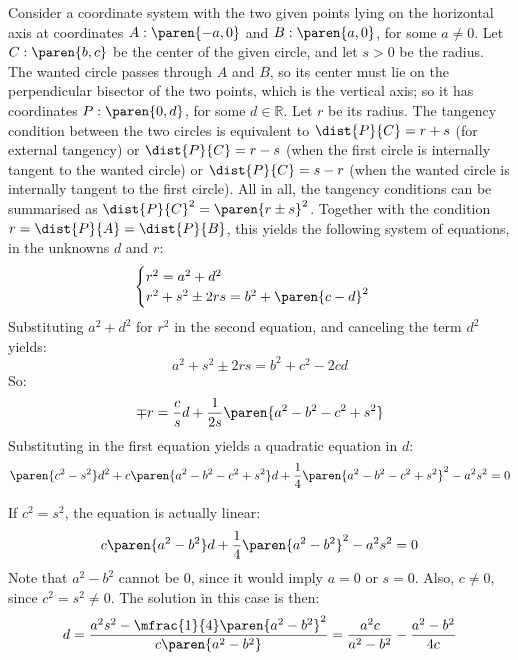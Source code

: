 Consider a coordinate system with the two given points lying on the horizontal axis
at coordinates $A: \paren{-a, 0}$ and $B: \paren{a, 0}$, for some $a \neq 0$.
Let $C: \paren{b, c}$ be the center of the given circle,
and let $s > 0$ be the radius. \newline
The wanted circle passes through $A$ and $B$,
so its center must lie on the perpendicular bisector of the two points,
which is the vertical axis;
so it has coordinates $P: \paren{0, d}$,
for some $d \in \mathbb{R}$.
Let $r$ be its radius.
The tangency condition between the two circles is equivalent to
$\dist{P}{C} = r + s$ (for external tangency)
or $\dist{P}{C} = r - s$ (when the first circle is internally tangent to the wanted circle)
or $\dist{P}{C} = s - r$ (when the wanted circle is internally tangent to the first circle).
All in all, the tangency conditions can be summarised as
$\dist{P}{C}^2 = \paren{r \pm s}^2$.
Together with the condition $r = \dist{P}{A} = \dist{P}{B}$,
this yields the following system of equations,
in the unknowns $d$ and $r$:
\begin{align*}
\begin{cases}
 r^2 = a^2 + d^2 \\
 r^2 + s^2 \pm 2 r s = b^2 + \paren{c - d}^2
\end{cases}
\end{align*}
Substituting $a^2 + d^2$ for $r^2$ in the second equation,
and canceling the term $d^2$ yields:
\begin{equation*}
 a^2 + s^2 \pm 2 r s = b^2 + c^2 - 2 c d
\end{equation*}
So:
\begin{equation*}
 \mp r = \frac{c}{s} d + \frac{1}{2 s} \paren{a^2 - b^2 - c^2 + s^2}
\end{equation*}
Substituting in the first equation yields a quadratic equation in $d$:
\begin{equation*}
 \paren{c^2 - s^2} d^2
 + c \paren{a^2 - b^2 - c^2 + s^2} d
 + \frac{1}{4} \paren{a^2 - b^2 - c^2 + s^2}^2 - a^2 s^2
 = 0
\end{equation*}

If $c^2 = s^2$, the equation is actually linear:
\begin{equation*}
 c \paren{a^2 - b^2} d
 + \frac{1}{4} \paren{a^2 - b^2}^2 - a^2 s^2
 = 0
\end{equation*}
Note that $a^2 - b^2$ cannot be $0$, since it would imply $a = 0$ or $s = 0$.
Also, $c \neq 0$, since $c^2 = s^2 \neq 0$.
The solution in this case is then:
\begin{equation*}
d = \frac{a^2 s^2 - \mfrac{1}{4} \paren{a^2 - b^2}^2}{c \paren{a^2 - b^2}}
   = \frac{a^2 c}{a^2 - b^2} - \frac{a^2 - b^2}{4 c}
\end{equation*}

